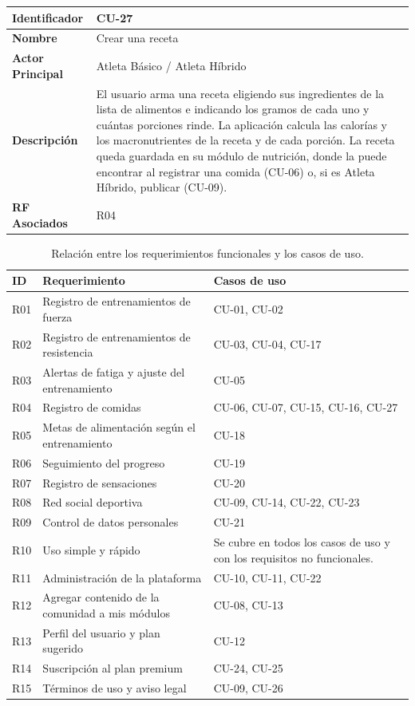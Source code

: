 \newpage
\begin{tabular}{|p{3.5cm}|p{11.5cm}|}
    \hline
    \rowcolor[HTML]{EFEFEF}
    \textbf{Identificador} & \textbf{CU-27} \\ \hline
    \textbf{Nombre} & Crear una receta \\ \hline
    \textbf{Actor Principal} & Atleta Básico / Atleta Híbrido \\ \hline
    \textbf{Descripción} & El usuario arma una receta eligiendo sus ingredientes de la lista de alimentos e indicando los gramos de cada uno y cuántas porciones rinde. La aplicación calcula las calorías y los macronutrientes de la receta y de cada porción. La receta queda guardada en su módulo de nutrición, donde la puede encontrar al registrar una comida (CU-06) o, si es Atleta Híbrido, publicar (CU-09). \\ \hline
    \textbf{RF Asociados} & R04 \\ \hline
\end{tabular}
\begin{table}[h!]
    \centering
    \renewcommand{\arraystretch}{1.3}
    \begin{tabular}{|p{1.5cm}|>{\raggedright\arraybackslash}p{7cm}|>{\raggedright\arraybackslash}p{6cm}|}
        \hline
        \rowcolor[HTML]{EFEFEF}
        \textbf{ID} & \textbf{Requerimiento} & \textbf{Casos de uso} \\ \hline
        R01 & Registro de entrenamientos de fuerza & CU-01, CU-02 \\ \hline
        R02 & Registro de entrenamientos de resistencia & CU-03, CU-04, CU-17 \\ \hline
        R03 & Alertas de fatiga y ajuste del entrenamiento & CU-05 \\ \hline
        R04 & Registro de comidas & CU-06, CU-07, CU-15, CU-16, CU-27 \\ \hline
        R05 & Metas de alimentación según el entrenamiento & CU-18 \\ \hline
        R06 & Seguimiento del progreso & CU-19 \\ \hline
        R07 & Registro de sensaciones & CU-20 \\ \hline
        R08 & Red social deportiva & CU-09, CU-14, CU-22, CU-23 \\ \hline
        R09 & Control de datos personales & CU-21 \\ \hline
        R10 & Uso simple y rápido & Se cubre en todos los casos de uso y con los requisitos no funcionales. \\ \hline
        R11 & Administración de la plataforma & CU-10, CU-11, CU-22 \\ \hline
        R12 & Agregar contenido de la comunidad a mis módulos & CU-08, CU-13 \\ \hline
        R13 & Perfil del usuario y plan sugerido & CU-12 \\ \hline
        R14 & Suscripción al plan premium & CU-24, CU-25 \\ \hline
        R15 & Términos de uso y aviso legal & CU-09, CU-26 \\ \hline
    \end{tabular}
    \caption{Relación entre los requerimientos funcionales y los casos de uso.}
    \label{tab:cu_requerimientos}
\end{table}
